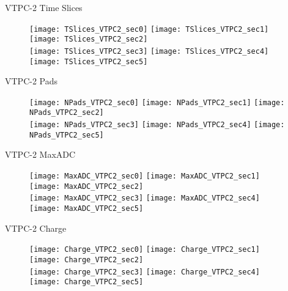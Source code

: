 \documentclass[11pt]{beamer}
\begin{document}
\begin{frame}{VTPC-2 Time Slices}
\begin{figure}
\centering
\texttt{[image: TSlices\_VTPC2\_sec0]}
\texttt{[image: TSlices\_VTPC2\_sec1]}
\texttt{[image: TSlices\_VTPC2\_sec2]}\\
\texttt{[image: TSlices\_VTPC2\_sec3]}
\texttt{[image: TSlices\_VTPC2\_sec4]}
\texttt{[image: TSlices\_VTPC2\_sec5]}
\end{figure}
\end{frame}

\begin{frame}{VTPC-2 Pads}
\begin{figure}
\centering
\texttt{[image: NPads\_VTPC2\_sec0]}
\texttt{[image: NPads\_VTPC2\_sec1]}
\texttt{[image: NPads\_VTPC2\_sec2]}\\
\texttt{[image: NPads\_VTPC2\_sec3]}
\texttt{[image: NPads\_VTPC2\_sec4]}
\texttt{[image: NPads\_VTPC2\_sec5]}
\end{figure}
\end{frame}

\begin{frame}{VTPC-2 MaxADC}
\begin{figure}
\centering
\texttt{[image: MaxADC\_VTPC2\_sec0]}
\texttt{[image: MaxADC\_VTPC2\_sec1]}
\texttt{[image: MaxADC\_VTPC2\_sec2]}\\
\texttt{[image: MaxADC\_VTPC2\_sec3]}
\texttt{[image: MaxADC\_VTPC2\_sec4]}
\texttt{[image: MaxADC\_VTPC2\_sec5]}
\end{figure}
\end{frame}

\begin{frame}{VTPC-2 Charge}
\begin{figure}
\centering
\texttt{[image: Charge\_VTPC2\_sec0]}
\texttt{[image: Charge\_VTPC2\_sec1]}
\texttt{[image: Charge\_VTPC2\_sec2]}\\
\texttt{[image: Charge\_VTPC2\_sec3]}
\texttt{[image: Charge\_VTPC2\_sec4]}
\texttt{[image: Charge\_VTPC2\_sec5]}
\end{figure}
\end{frame}
\end{document}
